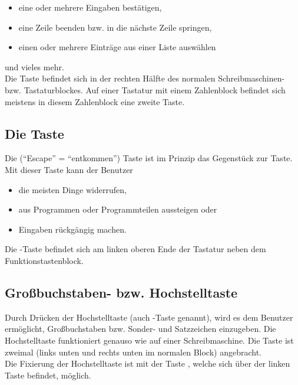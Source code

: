 \begin{itemize}
\item eine oder mehrere Eingaben best\"{a}tigen,
\item eine Zeile beenden bzw. in die n\"{a}chste Zeile springen,
\item einen oder mehrere Eintr\"{a}ge aus einer Liste ausw\"{a}hlen
\end{itemize}

und vieles mehr.\\

Die  Taste befindet sich in der rechten H\"{a}lfte des
normalen Schreibmaschinen- bzw. Tastaturblockes. Auf einer Tastatur
mit einem Zahlenblock befindet sich meistens in diesem Zahlenblock
eine zweite  Taste.

\subsection{Die \protect{} Taste}
Die  (``Escape'' = ``entkommen'') Taste ist im Prinzip das
Gegenst\"{u}ck zur  Taste. Mit dieser Taste kann der
Benutzer

\begin{itemize}
\item die meisten Dinge widerrufen,
\item aus Programmen oder Programmteilen aussteigen oder
\item Eingaben r\"{u}ckg\"{a}ngig machen.
\end{itemize}

Die -Taste befindet sich am linken oberen Ende der Tastatur neben
dem Funktionstastenblock.

\subsection{Gro{\ss}buchstaben- bzw. Hochstelltaste \protect{}}

Durch Dr\"{u}cken der Hochstelltaste (auch -Taste genannt),
wird es dem Benutzer erm\"{o}glicht, Gro{\ss}buchstaben bzw. Sonder-
und Satzzeichen einzugeben. Die Hochstelltaste funktioniert genauso
wie auf einer Schreibmaschine. Die  Taste ist zweimal
(links unten und rechts unten im normalen Block) angebracht.\\

Die Fixierung der Hochstelltaste ist mit der Taste , welche
sich \"{u}ber der linken  Taste befindet, m\"{o}glich.\\

